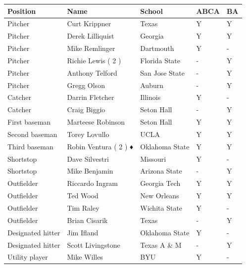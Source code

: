 \documentclass{article}
\begin{document}
\begin{tabular}{lllll}
\toprule
Position & Name & School & ABCA & BA \\
\midrule
Pitcher & Curt Krippner & Texas & Y & Y \\
Pitcher & Derek Lilliquist & Georgia & Y & Y \\
Pitcher & Mike Remlinger & Dartmouth & Y & - \\
Pitcher & Richie Lewis ( 2 ) & Florida State & - & Y \\
Pitcher & Anthony Telford & San Jose State & - & Y \\
Pitcher & Gregg Olson & Auburn & - & Y \\
Catcher & Darrin Fletcher & Illinois & Y & - \\
Catcher & Craig Biggio & Seton Hall & - & Y \\
First baseman & Marteese Robinson & Seton Hall & Y & Y \\
Second baseman & Torey Lovullo & UCLA & Y & Y \\
Third baseman & Robin Ventura ( 2 ) ♦ & Oklahoma State & Y & Y \\
Shortstop & Dave Silvestri & Missouri & Y & - \\
Shortstop & Mike Benjamin & Arizona State & - & Y \\
Outfielder & Riccardo Ingram & Georgia Tech & Y & Y \\
Outfielder & Ted Wood & New Orleans & Y & Y \\
Outfielder & Tim Raley & Wichita State & Y & - \\
Outfielder & Brian Cisarik & Texas & - & Y \\
Designated hitter & Jim Ifland & Oklahoma State & Y & - \\
Designated hitter & Scott Livingstone & Texas A \& M & - & Y \\
Utility player & Mike Willes & BYU & Y & - \\
\bottomrule
\end{tabular}
\end{document}
